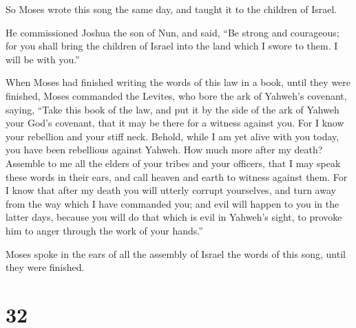  So Moses wrote this song the same day, and taught it to
the children of Israel.

 He commissioned Joshua the son of Nun, and said, ``Be
strong and courageous; for you shall bring the children of Israel into
the land which I swore to them. I will be with you.''

 When Moses had finished writing the words of this law in a
book, until they were finished,  Moses commanded the
Levites, who bore the ark of Yahweh's covenant, saying, 
``Take this book of the law, and put it by the side of the ark of Yahweh
your God's covenant, that it may be there for a witness against you.
 For I know your rebellion and your stiff neck. Behold,
while I am yet alive with you today, you have been rebellious against
Yahweh. How much more after my death?  Assemble to me all
the elders of your tribes and your officers, that I may speak these
words in their ears, and call heaven and earth to witness against them.
 For I know that after my death you will utterly corrupt
yourselves, and turn away from the way which I have commanded you; and
evil will happen to you in the latter days, because you will do that
which is evil in Yahweh's sight, to provoke him to anger through the
work of your hands.''

 Moses spoke in the ears of all the assembly of Israel the
words of this song, until they were finished.

\hypertarget{section-31}{%
\section{32}\label{section-31}}

